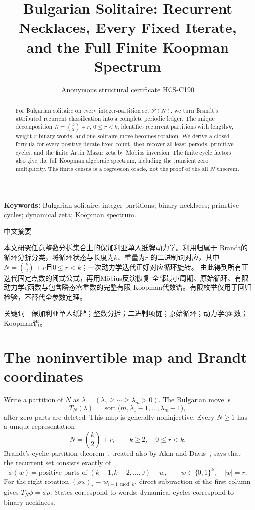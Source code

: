 \documentclass[9pt]{extarticle}
\title{Bulgarian Solitaire: Recurrent Necklaces, Every Fixed Iterate,\\
and the Full Finite Koopman Spectrum}
\author{Anonymous structural certificate HCS-C190}
\date{}
\begin{document}
\maketitle
\begin{abstract}
For Bulgarian solitaire on every integer-partition set $\mathcal P(N)$, we
turn Brandt's attributed recurrent classification into a complete periodic
ledger.  The unique decomposition $N=\binom{k}{2}+r$, $0\le r<k$, identifies
recurrent partitions with length-$k$, weight-$r$ binary words, and one
solitaire move becomes rotation.  We derive a closed formula for every
positive-iterate fixed count, then recover all least periods, primitive
cycles, and the finite Artin--Mazur zeta by M\"obius inversion.  The finite
cycle factors also give the full Koopman algebraic spectrum, including the
transient zero multiplicity.  The finite census is a regression oracle, not
the proof of the all-$N$ theorem.
\end{abstract}
\noindent\textbf{Keywords:} Bulgarian solitaire; integer partitions; binary
necklaces; primitive cycles; dynamical zeta; Koopman spectrum.

\begin{otherlanguage}{chinese-simplified}
\begin{center}{\large 中文摘要}\end{center}
本文研究任意整数分拆集合上的保加利亚单人纸牌动力学。利用归属于
\foreignlanguage{english}{Brandt}的循环分拆分类，将循环状态与长度为$k$、重量为$r$
的二进制词对应，其中$N=\binom{k}{2}+r$且$0\le r<k$；一次动力学迭代正好对应循环旋转。
由此得到所有正迭代固定点数的闭式公式，再用\foreignlanguage{english}{M\"obius}反演恢复
全部最小周期、原始循环、有限动力学$\zeta$函数与包含瞬态零重数的完整有限
\foreignlanguage{english}{Koopman}代数谱。有限枚举仅用于回归检验，不替代全参数定理。

\noindent 关键词：保加利亚单人纸牌；整数分拆；二进制项链；原始循环；动力学$\zeta$函数；
\foreignlanguage{english}{Koopman}谱。
\end{otherlanguage}

\section{The noninvertible map and Brandt coordinates}
Write a partition of $N$ as $\lambda=(\lambda_1\ge\cdots\ge\lambda_m>0)$.
The Bulgarian move is
\[
 T_N(\lambda)=\operatorname{sort}\bigl(m,\lambda_1-1,\ldots,
 \lambda_m-1\bigr),
\]
after zero parts are deleted.  This map is generally noninjective.  Every
$N\ge1$ has a unique representation
\[
 N=\binom{k}{2}+r,\qquad k\ge2,\quad 0\le r<k.
\]
Brandt's cyclic-partition theorem~\cite{Brandt82}, treated also by Akin and
Davis~\cite{AkinDavis85}, says that the recurrent set consists exactly of
\[
 \phi(w)=\text{positive parts of }(k-1,k-2,\ldots,0)+w,
 \qquad w\in\{0,1\}^k,\quad |w|=r.
\]
For the right rotation $(\rho w)_i=w_{i-1\bmod k}$, direct subtraction of the
first column gives $T_N\phi=\phi\rho$.  States correspond to words; dynamical
cycles correspond to binary necklaces.
\end{document}
